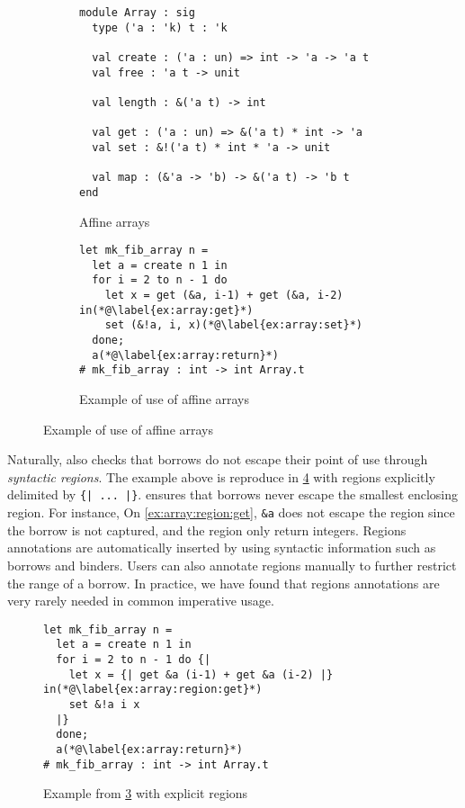 \begin{figure}
  \centering
  \begin{subfigure}{0.48\linewidth}
\begin{lstlisting}
module Array : sig
  type ('a : 'k) t : 'k
  
  val create : ('a : un) => int -> 'a -> 'a t
  val free : 'a t -> unit

  val length : &('a t) -> int

  val get : ('a : un) => &('a t) * int -> 'a
  val set : &!('a t) * int * 'a -> unit
  
  val map : (&'a -> 'b) -> &('a t) -> 'b t
end
\end{lstlisting}
    \caption{Affine arrays}
    \label{sig:array}
  \end{subfigure}\hfill
  \begin{subfigure}{0.5\linewidth}
\begin{lstlisting}
let mk_fib_array n =
  let a = create n 1 in
  for i = 2 to n - 1 do
    let x = get (&a, i-1) + get (&a, i-2) in(*@\label{ex:array:get}*)
    set (&!a, i, x)(*@\label{ex:array:set}*)
  done;
  a(*@\label{ex:array:return}*)
# mk_fib_array : int -> int Array.t
\end{lstlisting}
    \caption{Example of use of affine arrays}
    \label{ex:array}
  \end{subfigure}
\end{figure}

Naturally, \lang also checks that borrows do not escape their point
of use through {\em syntactic regions}. The example
above is reproduce in \cref{ex:array:region} with
regions explicitly delimited by \lstinline/{| ... |}/.
\lang ensures that borrows never escape the smallest enclosing
region.
For instance, On \cref{ex:array:region:get}, \lstinline/&a/ does
not escape the region since the borrow is not captured, and the
region only return integers.
Regions annotations are automatically inserted by \lang using
syntactic information such as borrows and binders.
Users can also annotate regions manually to further restrict the range
of a borrow. In practice, we have found that regions
annotations are very rarely needed in common imperative usage.


\begin{figure}
  \centering
\begin{lstlisting}
let mk_fib_array n =
  let a = create n 1 in
  for i = 2 to n - 1 do {|
    let x = {| get &a (i-1) + get &a (i-2) |} in(*@\label{ex:array:region:get}*)
    set &!a i x
  |}
  done;
  a(*@\label{ex:array:return}*)
# mk_fib_array : int -> int Array.t
\end{lstlisting}
    \caption{Example from \cref{ex:array} with explicit regions}
    \label{ex:array:region}
\end{figure}



